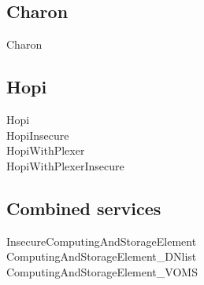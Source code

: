 \documentclass{article}
\begin{document}
\subsection{Charon}
\begin{description}
\item[Charon]
\end{description}

\subsection{Hopi}
\begin{description}
\item[Hopi]
\item[HopiInsecure]
\item[HopiWithPlexer]
\item[HopiWithPlexerInsecure]
\end{description}

\subsection{Combined services}
\begin{description}
\item[InsecureComputingAndStorageElement]
\item[ComputingAndStorageElement\_DNlist]
\item[ComputingAndStorageElement\_VOMS]
\end{description}
\end{document}
